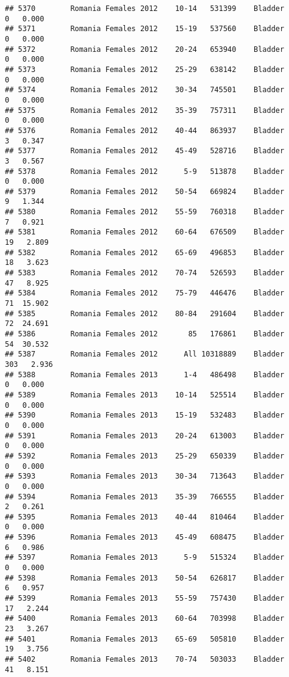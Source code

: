 \documentclass[
]{article}
\begin{document}
\begin{verbatim}
## 5370        Romania Females 2012    10-14   531399    Bladder      0   0.000
## 5371        Romania Females 2012    15-19   537560    Bladder      0   0.000
## 5372        Romania Females 2012    20-24   653940    Bladder      0   0.000
## 5373        Romania Females 2012    25-29   638142    Bladder      0   0.000
## 5374        Romania Females 2012    30-34   745501    Bladder      0   0.000
## 5375        Romania Females 2012    35-39   757311    Bladder      0   0.000
## 5376        Romania Females 2012    40-44   863937    Bladder      3   0.347
## 5377        Romania Females 2012    45-49   528716    Bladder      3   0.567
## 5378        Romania Females 2012      5-9   513878    Bladder      0   0.000
## 5379        Romania Females 2012    50-54   669824    Bladder      9   1.344
## 5380        Romania Females 2012    55-59   760318    Bladder      7   0.921
## 5381        Romania Females 2012    60-64   676509    Bladder     19   2.809
## 5382        Romania Females 2012    65-69   496853    Bladder     18   3.623
## 5383        Romania Females 2012    70-74   526593    Bladder     47   8.925
## 5384        Romania Females 2012    75-79   446476    Bladder     71  15.902
## 5385        Romania Females 2012    80-84   291604    Bladder     72  24.691
## 5386        Romania Females 2012       85   176861    Bladder     54  30.532
## 5387        Romania Females 2012      All 10318889    Bladder    303   2.936
## 5388        Romania Females 2013      1-4   486498    Bladder      0   0.000
## 5389        Romania Females 2013    10-14   525514    Bladder      0   0.000
## 5390        Romania Females 2013    15-19   532483    Bladder      0   0.000
## 5391        Romania Females 2013    20-24   613003    Bladder      0   0.000
## 5392        Romania Females 2013    25-29   650339    Bladder      0   0.000
## 5393        Romania Females 2013    30-34   713643    Bladder      0   0.000
## 5394        Romania Females 2013    35-39   766555    Bladder      2   0.261
## 5395        Romania Females 2013    40-44   810464    Bladder      0   0.000
## 5396        Romania Females 2013    45-49   608475    Bladder      6   0.986
## 5397        Romania Females 2013      5-9   515324    Bladder      0   0.000
## 5398        Romania Females 2013    50-54   626817    Bladder      6   0.957
## 5399        Romania Females 2013    55-59   757430    Bladder     17   2.244
## 5400        Romania Females 2013    60-64   703998    Bladder     23   3.267
## 5401        Romania Females 2013    65-69   505810    Bladder     19   3.756
## 5402        Romania Females 2013    70-74   503033    Bladder     41   8.151

\end{verbatim}
\end{document}
